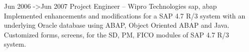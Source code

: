 Jun 2006 ->Jun 2007 Project Engineer – Wipro Technologies
sap, abap
Implemented enhancements and modifications for a SAP 4.7 R/3 system with an underlying Oracle database using ABAP, Object Oriented ABAP and
Java.
Customized forms, screens, for the SD, PM, FICO modules of SAP 4.7 R/3 system.